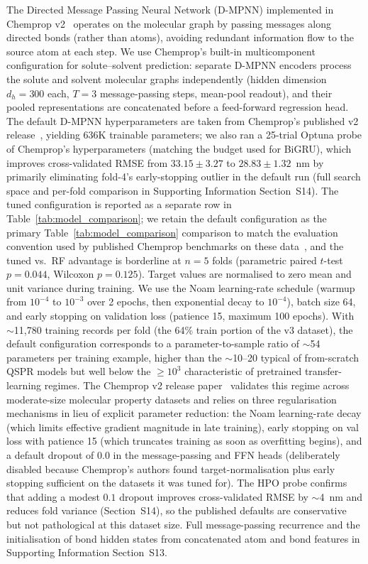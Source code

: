 \documentclass[journal=jcisd8,manuscript=article]{achemso}
\begin{document}
The Directed Message Passing Neural Network (D-MPNN) implemented in Chemprop v2~\cite{yangAnalyzingLearnedMolecular2019,chempropv2_2024} operates on the molecular graph by passing messages along directed bonds (rather than atoms), avoiding redundant information flow to the source atom at each step. We use Chemprop's built-in multicomponent configuration for solute--solvent prediction: separate D-MPNN encoders process the solute and solvent molecular graphs independently (hidden dimension $d_h = 300$ each, $T = 3$ message-passing steps, mean-pool readout), and their pooled representations are concatenated before a feed-forward regression head. The default D-MPNN hyperparameters are taken from Chemprop's published v2 release~\cite{yangAnalyzingLearnedMolecular2019,chempropv2_2024}, yielding 636K trainable parameters; we also ran a 25-trial Optuna probe of Chemprop's hyperparameters (matching the budget used for BiGRU), which improves cross-validated RMSE from $33.15 \pm 3.27$ to $28.83 \pm 1.32$~nm by primarily eliminating fold-4's early-stopping outlier in the default run (full search space and per-fold comparison in Supporting Information Section~S14). The tuned configuration is reported as a separate row in Table~\ref{tab:model_comparison}; we retain the default configuration as the primary Table~\ref{tab:model_comparison} comparison to match the evaluation convention used by published Chemprop benchmarks on these data~\cite{joung2021deep,beard2019comparative,greenman2022multifidelity,jung2024machine,chempropv2_2024}, and the tuned vs.\ RF advantage is borderline at $n = 5$ folds (parametric paired $t$-test $p = 0.044$, Wilcoxon $p = 0.125$). Target values are normalised to zero mean and unit variance during training. We use the Noam learning-rate schedule (warmup from $10^{-4}$ to $10^{-3}$ over 2 epochs, then exponential decay to $10^{-4}$), batch size 64, and early stopping on validation loss (patience 15, maximum 100 epochs). With $\sim$11{,}780 training records per fold (the 64\% train portion of the v3 dataset), the default configuration corresponds to a parameter-to-sample ratio of $\sim$54 parameters per training example, higher than the $\sim$10--20 typical of from-scratch QSPR models but well below the $\geq 10^3$ characteristic of pretrained transfer-learning regimes. The Chemprop v2 release paper~\cite{chempropv2_2024} validates this regime across moderate-size molecular property datasets and relies on three regularisation mechanisms in lieu of explicit parameter reduction: the Noam learning-rate decay (which limits effective gradient magnitude in late training), early stopping on val loss with patience 15 (which truncates training as soon as overfitting begins), and a default dropout of $0.0$ in the message-passing and FFN heads (deliberately disabled because Chemprop's authors found target-normalisation plus early stopping sufficient on the datasets it was tuned for). The HPO probe confirms that adding a modest $0.1$ dropout improves cross-validated RMSE by $\sim$4~nm and reduces fold variance (Section~S14), so the published defaults are conservative but not pathological at this dataset size. Full message-passing recurrence and the initialisation of bond hidden states from concatenated atom and bond features in Supporting Information Section~S13.
\end{document}

